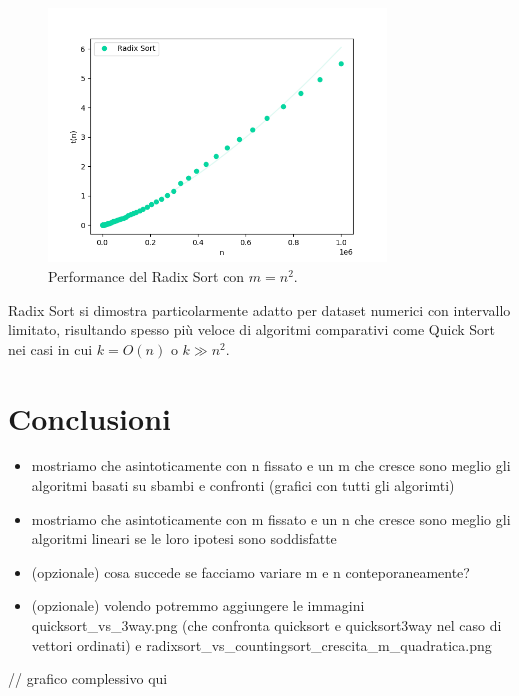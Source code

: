 \documentclass[a4paper, 12pt, oneside]{book}
\begin{document}
\begin{figure}[H]
    \centering
    \includegraphics[width=0.8\textwidth]{images/radixsort_nlogn.png}
    \caption{Performance del Radix Sort con \(m = n^2\).}
    \label{fig:radix_sort_3_way_m}
\end{figure}

\noindent Radix Sort si dimostra particolarmente adatto per dataset numerici con intervallo limitato, risultando spesso più veloce di algoritmi comparativi come Quick Sort nei casi in cui \(k = O(n)\) o \(k \gg n^2\).




\chapter{Conclusioni}\label{chap:Conclusioni} %

\begin{itemize}
    \item mostriamo che asintoticamente con n fissato e un m che cresce sono meglio gli algoritmi basati su sbambi e confronti (grafici con tutti gli algorimti)
    \item mostriamo che asintoticamente con m fissato e un n che cresce sono meglio gli algoritmi lineari se le loro ipotesi sono soddisfatte
    \item (opzionale) cosa succede se facciamo variare m e n conteporaneamente?
    \item (opzionale) volendo potremmo aggiungere le immagini quicksort_vs_3way.png (che confronta quicksort e quicksort3way nel caso di vettori ordinati) e radixsort_vs_countingsort_crescita_m_quadratica.png
\end{itemize}

// grafico complessivo qui

\end{document}

